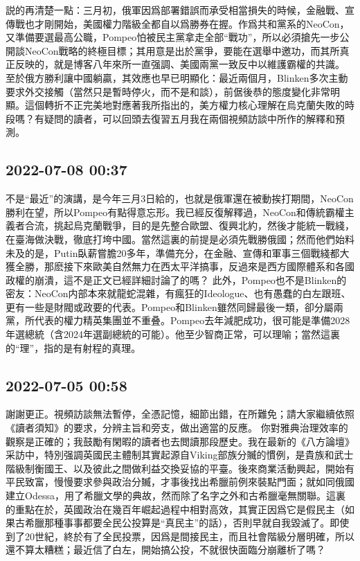 \documentclass[twocolumn]{ctexart}
\begin{document}
説的再清楚一點：三月初，俄軍因爲部署錯誤而承受相當損失的時候，金融戰、宣傳戰也才剛開始，美國權力階級全都自以爲勝券在握。作爲共和黨系的NeoCon，又準備要選最高公職，Pompeo怕被民主黨拿走全部“戰功”，所以必須搶先一步公開談NeoCon戰略的終極目標；其用意是出於黨爭，要能在選舉中邀功，而其所真正反映的，就是博客八年來所一直强調、美國兩黨一致反中以維護霸權的共識。
至於俄方勝利讓中國躺贏，其效應也早已明顯化：最近兩個月，Blinken多次主動要求外交接觸（當然只是暫時停火，而不是和談），前倨後恭的態度變化非常明顯。這個轉折不正完美地對應著我所指出的，美方權力核心理解在烏克蘭失敗的時段嗎？有疑問的讀者，可以回頭去復習五月我在兩個視頻訪談中所作的解釋和預測。
\subsection*{2022-07-08 00:37}

不是“最近”的演講，是今年三月3日給的，也就是俄軍還在被動挨打期間，NeoCon勝利在望，所以Pompeo有點得意忘形。我已經反復解釋過，NeoCon和傳統霸權主義者合流，挑起烏克蘭戰爭，目的是先整合歐盟、復興北約，然後才能統一戰綫，在臺海做決戰，徹底打垮中國。當然這裏的前提是必須先戰勝俄國；然而他們始料未及的是，Putin臥薪嘗膽20多年，準備充分，在金融、宣傳和軍事三個戰綫都大獲全勝，那麽接下來歐美自然無力在西太平洋搞事，反過來是西方國際體系和各國政權的崩潰，這不是正文已經詳細討論了的嗎？
此外，Pompeo也不是Blinken的密友：NeoCon内部本來就龍蛇混雜，有瘋狂的Ideologue、也有愚蠢的白左跟班、更有一些是財閥或政要的代表。Pompeo和Blinken雖然同歸最後一類，卻分屬兩黨，所代表的權力精英集團並不重叠。Pompeo去年減肥成功，很可能是準備2028年選總統（含2024年選副總統的可能）。他至少智商正常，可以理喻；當然這裏的“理”，指的是有射程的真理。
\subsection*{2022-07-05 00:58}

謝謝更正。視頻訪談無法暫停，全憑記憶，細節出錯，在所難免；請大家繼續依照《讀者須知》的要求，分辨主旨和旁支，做出適當的反應。
你對雅典治理效率的觀察是正確的；我鼓勵有閑暇的讀者也去閲讀那段歷史。我在最新的《八方論壇》采訪中，特別强調英國民主體制其實起源自Viking部族分贓的慣例，是貴族和武士階級制衡國王、以及彼此之間做利益交換妥協的平臺。後來商業活動興起，開始有平民致富，慢慢要求參與政治分贓，才事後找出希臘前例來裝點門面；就如同俄國建立Odessa，用了希臘文學的典故，然而除了名字之外和古希臘毫無關聯。這裏的重點在於，英國政治在幾百年崛起過程中相對高效，其實正因爲它是假民主（如果古希臘那種事事都要全民公投算是“真民主”的話），否則早就自我毀滅了。即使到了20世紀，終於有了全民投票，因爲是間接民主，而且社會階級分層明確，所以還不算太糟糕；最近信了白左，開始搞公投，不就很快面臨分崩離析了嗎？
\end{document}

